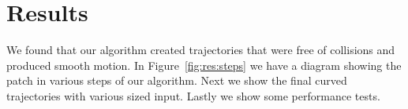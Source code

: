 \section{Results}
\label{sec:results}

We found that our algorithm created trajectories that were free of collisions and produced smooth motion. In Figure~\ref{fig:res:steps} we have a diagram showing the patch in various steps of our algorithm. Next we show the final curved trajectories with various sized input. Lastly we show some performance tests.


% 
% 
% 


